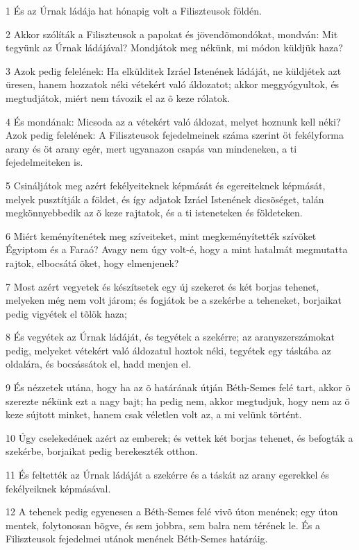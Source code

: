 \par 1 És az Úrnak ládája hat hónapig volt a Filiszteusok földén.
\par 2 Akkor szólíták a Filiszteusok a papokat és jövendõmondókat, mondván: Mit tegyünk az Úrnak ládájával? Mondjátok meg nékünk, mi módon küldjük haza?
\par 3 Azok pedig felelének: Ha elkülditek Izráel Istenének ládáját, ne küldjétek azt üresen, hanem hozzatok néki vétekért való áldozatot; akkor meggyógyultok, és megtudjátok, miért nem távozik el az õ keze rólatok.
\par 4 És mondának: Micsoda az a vétekért való áldozat, melyet hoznunk kell néki? Azok pedig felelének: A Filiszteusok fejedelmeinek száma szerint öt fekélyforma arany és öt arany egér, mert ugyanazon csapás van mindeneken, a ti fejedelmeiteken is.
\par 5 Csináljátok meg azért fekélyeiteknek képmását és egereiteknek képmását, melyek pusztítják a földet, és így adjatok Izráel Istenének dicsõséget, talán megkönnyebbedik az õ keze rajtatok, és a ti isteneteken és földeteken.
\par 6 Miért keményítenétek meg szíveiteket, mint megkeményítették szívöket Égyiptom és a Faraó? Avagy nem úgy volt-é, hogy a mint hatalmát megmutatta rajtok, elbocsátá õket, hogy elmenjenek?
\par 7 Most azért vegyetek és készítsetek egy új szekeret és két borjas tehenet, melyeken még nem volt járom; és fogjátok be a szekérbe a teheneket, borjaikat pedig vigyétek el tõlök haza;
\par 8 És vegyétek az Úrnak ládáját, és tegyétek a szekérre; az aranyszerszámokat pedig, melyeket vétekért való áldozatul hoztok néki, tegyétek egy táskába az oldalára, és bocsássátok el, hadd menjen el.
\par 9 És nézzetek utána, hogy ha az õ határának útján Béth-Semes felé tart, akkor õ szerezte nékünk ezt a nagy bajt; ha pedig nem, akkor megtudjuk, hogy nem az õ keze sújtott minket, hanem csak véletlen volt az, a mi velünk történt.
\par 10 Úgy cselekedének azért az emberek; és vettek két borjas tehenet, és befogták a szekérbe, borjaikat pedig berekeszték otthon.
\par 11 És feltették az Úrnak ládáját a szekérre és a táskát az arany egerekkel és fekélyeiknek képmásával.
\par 12 A tehenek pedig egyenesen a Béth-Semes felé vivõ úton menének; egy úton mentek, folytonosan bõgve, és sem jobbra, sem balra nem térének le. És a Filiszteusok fejedelmei utánok menének Béth-Semes határáig.
